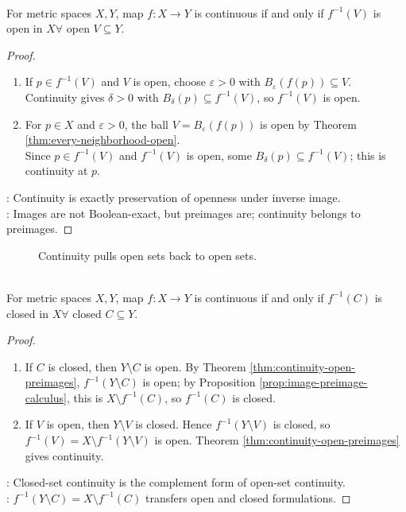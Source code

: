 \begin{theorem} \label{thm:continuity-open-preimages}\label{thm:continuity-structure-results-source-todo} \\
For metric spaces $X,Y$, map $f:X\to Y$ is continuous if and only if $f^{-1}(V)$ is open in $X \forall$ open $V\subseteq Y$.
\begin{proof}
\begin{enumerate}[label=\roman*.]
\setlength{\itemsep}{0pt}
\item[$(\Rightarrow)$] If $p\in f^{-1}(V)$ and $V$ is open, choose $\varepsilon>0$ with $B_\varepsilon(f(p))\subseteq V$.\\
Continuity gives $\delta>0$ with $B_\delta(p)\subseteq f^{-1}(V)$, so $f^{-1}(V)$ is open.
\item[$(\Leftarrow)$] For $p\in X$ and $\varepsilon>0$, the ball $V=B_\varepsilon(f(p))$ is open by Theorem \ref{thm:every-neighborhood-open}.\\
Since $p\in f^{-1}(V)$ and $f^{-1}(V)$ is open, some $B_\delta(p)\subseteq f^{-1}(V)$; this is continuity at $p$.
\end{enumerate}
: Continuity is exactly preservation of openness under inverse image.\\
: Images are not Boolean-exact, but preimages are; continuity belongs to preimages.
\end{proof}
\end{theorem}

\begin{figure}[H]
  \centering
  
  \caption{Continuity pulls open sets back to open sets.}
  \label{fig:continuity-preimage-open}
\end{figure}

\begin{corollary} \label{cor:continuity-closed-preimages} \\
For metric spaces $X,Y$, map $f:X\to Y$ is continuous if and only if $f^{-1}(C)$ is closed in $X \forall$ closed $C\subseteq Y$.
\begin{proof}
\begin{enumerate}[label=\roman*.]
\setlength{\itemsep}{0pt}
\item[$(\Rightarrow)$] If $C$ is closed, then $Y\setminus C$ is open. By Theorem \ref{thm:continuity-open-preimages}, $f^{-1}(Y\setminus C)$ is open; by Proposition \ref{prop:image-preimage-calculus}, this is $X\setminus f^{-1}(C)$, so $f^{-1}(C)$ is closed.
\item[$(\Leftarrow)$] If $V$ is open, then $Y\setminus V$ is closed. Hence $f^{-1}(Y\setminus V)$ is closed, so $f^{-1}(V)=X\setminus f^{-1}(Y\setminus V)$ is open. Theorem \ref{thm:continuity-open-preimages} gives continuity.
\end{enumerate}
: Closed-set continuity is the complement form of open-set continuity.\\
: $f^{-1}(Y\setminus C)=X\setminus f^{-1}(C)$ transfers open and closed formulations.
\end{proof}
\end{corollary}

